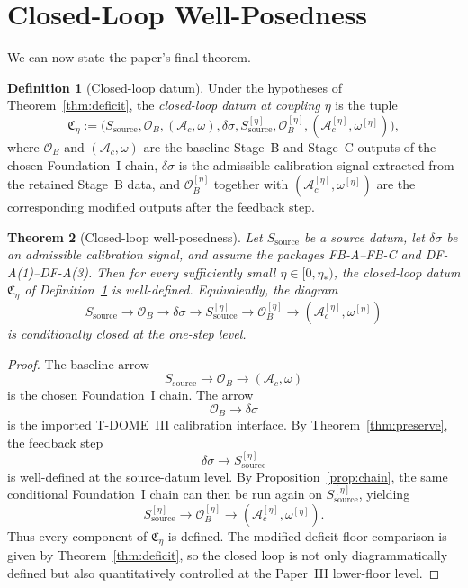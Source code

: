 \documentclass[12pt]{article}
\newtheorem{theorem}{Theorem}[section]
\theoremstyle{definition}
\newtheorem{definition}[theorem]{Definition}
\theoremstyle{remark}
\begin{document}
\section{Closed-Loop Well-Posedness}\label{sec:closed}

We can now state the paper's final theorem.

\begin{definition}[Closed-loop datum]\label{def:closed}
Under the hypotheses of Theorem~\ref{thm:deficit}, the
\emph{closed-loop datum at coupling \(\eta\)} is the tuple
\[
\mathfrak C_\eta
:=
\bigl(
S_{\mathrm{source}},
\mathcal O_B,
(\mathcal A_c,\omega),
\delta\sigma,
S_{\mathrm{source}}^{[\eta]},
\mathcal O_B^{[\eta]},
(\mathcal A_c^{[\eta]},\omega^{[\eta]})
\bigr),
\]
where \(\mathcal O_B\) and \((\mathcal A_c,\omega)\) are the baseline
Stage~B and Stage~C outputs of the chosen Foundation~I chain,
\(\delta\sigma\) is the admissible calibration signal extracted from the
retained Stage~B data, and
\(\mathcal O_B^{[\eta]}\) together with
\((\mathcal A_c^{[\eta]},\omega^{[\eta]})\) are the corresponding
modified outputs after the feedback step.
\end{definition}

\begin{theorem}[Closed-loop well-posedness]\label{thm:closed}
Let \(S_{\mathrm{source}}\) be a source datum, let
\(\delta\sigma\) be an admissible calibration signal, and assume the
packages FB-A--FB-C and DF-A(1)--DF-A(3). Then for every sufficiently
small \(\eta\in[0,\eta_*)\), the closed-loop datum
\(\mathfrak C_\eta\) of Definition~\ref{def:closed} is well-defined.
Equivalently, the diagram
\[
S_{\mathrm{source}}
\longrightarrow
 \mathcal O_B
\longrightarrow
\delta\sigma
\longrightarrow
S_{\mathrm{source}}^{[\eta]}
\longrightarrow
 \mathcal O_B^{[\eta]}
 \longrightarrow
 (\mathcal A_c^{[\eta]},\omega^{[\eta]})
\]
is conditionally closed at the one-step level.
\end{theorem}

\begin{proof}
The baseline arrow
\[
S_{\mathrm{source}}\to \mathcal O_B \to (\mathcal A_c,\omega)
\]
is the chosen Foundation~I chain. The arrow
\[
\mathcal O_B \to\delta\sigma
\]
is the imported T-DOME~III calibration interface. By
Theorem~\ref{thm:preserve}, the feedback step
\[
\delta\sigma \to S_{\mathrm{source}}^{[\eta]}
\]
is well-defined at the source-datum level. By
Proposition~\ref{prop:chain}, the same conditional Foundation~I chain
can then be run again on \(S_{\mathrm{source}}^{[\eta]}\), yielding
\[
S_{\mathrm{source}}^{[\eta]}
\to
\mathcal O_B^{[\eta]}
\to
(\mathcal A_c^{[\eta]},\omega^{[\eta]}).
\]
Thus every component of \(\mathfrak C_\eta\) is defined. The modified
deficit-floor comparison is given by Theorem~\ref{thm:deficit}, so the
closed loop is not only diagrammatically defined but also quantitatively
controlled at the Paper~III lower-floor level.
\end{proof}
\end{document}
